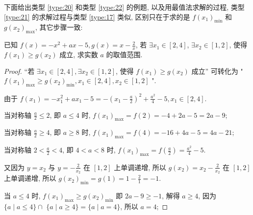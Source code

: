下面给出类型 \ref{type:20} 和类型 \ref{type:22} 的例题, 以及用最值法求解的过程, 类型 \ref{type:21} 的求解过程与类型 \ref{type:17} 类似, 区别只在于求的是 \(f{\left( {x}_{1}\right) }_{\min }\) 和 \(g{\left( {x}_{2}\right) }_{\max }\), 其它步骤一致:

\begin{variation}\label{variation:2.1.12}
  已知 \(f(x)  =  -{x}^{2} + {ax} -5, g(x)  = x -\frac{2}{x}\), 若 \(\exists {x}_{1} \in  \left\lbrack  {2, 4}\right\rbrack\), \(\exists {x}_{2} \in  \left\lbrack  {1, 2}\right\rbrack\), 使得 \(f\left( {x}_{1}\right)  \geq  g\left( {x}_{2}\right)\) 成立, 求实数 \(a\) 的取值范围.
\end{variation}


\begin{proof}
  “若 \(\exists {x}_{1} \in  \left\lbrack  {2, 4}\right\rbrack  , \exists {x}_{2} \in  \left\lbrack  {1, 2}\right\rbrack\), 使得 \(f\left( {x}_{1}\right)  \geq  g\left( {x}_{2}\right)\) 成立” 可转化为 " \(f{\left( {x}_{1}\right) }_{\max } \geq  g{\left( {x}_{2}\right) }_{\min }, {x}_{1} \in  \left\lbrack  {2, 4}\right\rbrack  , {x}_{2} \in  \left\lbrack  {1, 2}\right\rbrack\) ".

由于 \(f\left( {x}_{1}\right)  =  -{x}_{1}^{2} + a{x}_{1} -5 =  -{\left( {x}_{1} -\frac{a}{2}\right) }^{2} + \frac{{a}^{2}}{4} -5, {x}_{1} \in  \left\lbrack  {2, 4}\right\rbrack\).

当对称轴 \(\frac{a}{2} \leq  2\), 即 \(a \leq  4\) 时, \(f{\left( {x}_{1}\right) }_{\max } = f\left( 2\right)  =  -4 + {2a} -5 = {2a} -9\);

当对称轴 \(\frac{a}{2} \geq  4\), 即 \(a \geq  8\) 时, \(f{\left( {x}_{1}\right) }_{\max } = f\left( 4\right)  =  -{16} + {4a} -5 = {4a} -{21}\);

当对称轴 \(2 < \frac{a}{2} < 4\), 即 \(4 < a < 8\) 时, \(f{\left( {x}_{1}\right) }_{\max } = f\left( \frac{a}{2}\right)  = \frac{{a}^{2}}{4} -5\).

又因为 \(y = {x}_{2}\) 与 \(y =  -\frac{2}{{x}_{2}}\) 在 \(\left\lbrack  {1, 2}\right\rbrack\) 上单调递增, 所以 \(g\left( {x}_{2}\right)  = {x}_{2} -\frac{2}{{x}_{2}}\) 在 \(\left\lbrack  {1, 2}\right\rbrack\) 上单调递增, 所以 \(g{\left( {x}_{2}\right) }_{\min } = g\left( 1\right)  = 1 -\frac{2}{1} =  -1\).

当 \(a \leq  4\) 时, \(f{\left( {x}_{1}\right) }_{\max } \geq  g{\left( {x}_{2}\right) }_{\min }\) 即 \({2a} -9 \geq   -1\), 解得 \(a \geq  4\), 因为 \(\{ a \mid  a \leq  4\}  \cap\)  \(\{ a \mid  a \geq  4\}  = \{ a \mid  a = 4\}\), 所以 \(a = 4\);


\end{proof}
